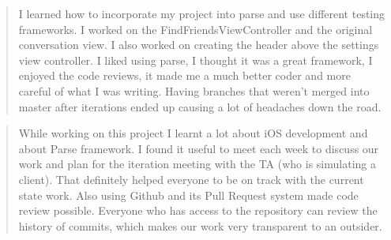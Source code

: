 \begin{quote}
I learned how to incorporate my project into parse and use different testing frameworks. I worked on the FindFriendsViewController and the original conversation view. I also worked on creating the header above the settings view controller. I liked using parse, I thought it was a great framework, I enjoyed the code reviews, it made me a much better coder and more careful of what I was writing. Having branches that weren't merged into master after iterations ended up causing a lot of headaches down the road.
\end{quote}

\begin{quote}
While working on this project I learnt a lot about iOS development and about Parse framework. I found it useful to meet each week to discuss our work and plan for the iteration meeting with the TA (who is simulating a client). That definitely helped everyone to be on track with the current state work. Also using Github and its Pull Request system made code review possible. Everyone who has access to the repository can review the history of commits, which makes our work very transparent to an outsider.
\end{quote}
